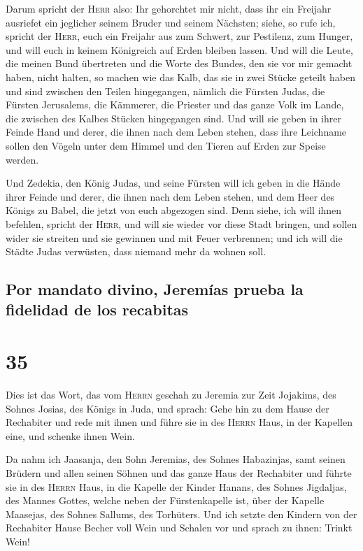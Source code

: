  Darum spricht der \textsc{Herr} also: Ihr gehorchtet mir
nicht, dass ihr ein Freijahr ausriefet ein jeglicher seinem Bruder und
seinem Nächsten; siehe, so rufe ich, spricht der \textsc{Herr}, euch ein
Freijahr aus zum Schwert, zur Pestilenz, zum Hunger, und will euch in
keinem Königreich auf Erden bleiben lassen.  Und will die
Leute, die meinen Bund übertreten und die Worte des Bundes, den sie vor
mir gemacht haben, nicht halten, so machen wie das Kalb, das sie in zwei
Stücke geteilt haben und sind zwischen den Teilen hingegangen,
 nämlich die Fürsten Judas, die Fürsten Jerusalems, die
Kämmerer, die Priester und das ganze Volk im Lande, die zwischen des
Kalbes Stücken hingegangen sind.  Und will sie geben in
ihrer Feinde Hand und derer, die ihnen nach dem Leben stehen, dass ihre
Leichname sollen den Vögeln unter dem Himmel und den Tieren auf Erden
zur Speise werden.

 Und Zedekia, den König Judas, und seine Fürsten will ich
geben in die Hände ihrer Feinde und derer, die ihnen nach dem Leben
stehen, und dem Heer des Königs zu Babel, die jetzt von euch abgezogen
sind.  Denn siehe, ich will ihnen befehlen, spricht der
\textsc{Herr}, und will sie wieder vor diese Stadt bringen, und sollen
wider sie streiten und sie gewinnen und mit Feuer verbrennen; und ich
will die Städte Judas verwüsten, dass niemand mehr da wohnen soll.

\hypertarget{por-mandato-divino-jeremuxedas-prueba-la-fidelidad-de-los-recabitas}{%
\subsection{Por mandato divino, Jeremías prueba la fidelidad de los
recabitas}\label{por-mandato-divino-jeremuxedas-prueba-la-fidelidad-de-los-recabitas}}

\hypertarget{section-34}{%
\section{35}\label{section-34}}

 Dies ist das Wort, das vom \textsc{Herrn} geschah zu
Jeremia zur Zeit Jojakims, des Sohnes Josias, des Königs in Juda, und
sprach:  Gehe hin zu dem Hause der Rechabiter und rede mit
ihnen und führe sie in des \textsc{Herrn} Haus, in der Kapellen eine,
und schenke ihnen Wein.

 Da nahm ich Jaasanja, den Sohn Jeremias, des Sohnes
Habazinjas, samt seinen Brüdern und allen seinen Söhnen und das ganze
Haus der Rechabiter  und führte sie in des \textsc{Herrn}
Haus, in die Kapelle der Kinder Hanans, des Sohnes Jigdaljas, des Mannes
Gottes, welche neben der Fürstenkapelle ist, über der Kapelle Maasejas,
des Sohnes Sallums, des Torhüters.  Und ich setzte den
Kindern von der Rechabiter Hause Becher voll Wein und Schalen vor und
sprach zu ihnen: Trinkt Wein!

